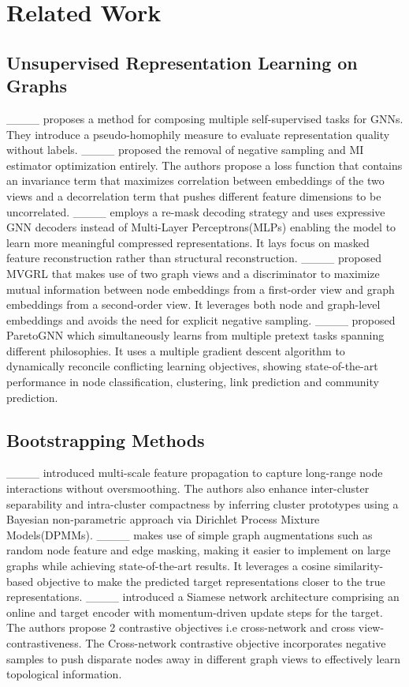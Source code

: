 \section{Related Work}
\subsection{Unsupervised Representation Learning on Graphs}
____ proposes a method for composing multiple self-supervised tasks for GNNs. They introduce a pseudo-homophily measure to evaluate representation quality without labels. ____ proposed the removal of negative sampling and MI estimator optimization entirely. The authors propose a loss function that contains an invariance term that maximizes correlation between embeddings of the two views and a decorrelation term that pushes different feature dimensions to be uncorrelated. ____ employs a re-mask decoding strategy and uses expressive GNN decoders instead of Multi-Layer Perceptrons(MLPs) enabling the model to learn more meaningful compressed representations. It lays focus on masked feature reconstruction rather than structural reconstruction. ____ proposed MVGRL that makes use of two graph views and a discriminator to maximize mutual information between node embeddings from a first-order view and graph embeddings from a second-order view. It leverages both node and graph-level embeddings and avoids the need for explicit negative sampling. ____ proposed ParetoGNN which simultaneously learns from multiple pretext tasks spanning different philosophies. It uses a multiple gradient descent algorithm to dynamically reconcile conflicting learning objectives, showing state-of-the-art performance in node classification, clustering, link prediction and community prediction. 

\subsection{Bootstrapping Methods}
 ____ introduced  multi-scale feature propagation to capture long-range node interactions without oversmoothing. The authors also enhance inter-cluster separability and intra-cluster compactness by inferring cluster prototypes using a Bayesian non-parametric approach via Dirichlet Process Mixture Models(DPMMs). ____ makes use of simple graph augmentations such as random node feature and edge masking, making it easier to implement on large graphs while achieving state-of-the-art results. It leverages a cosine similarity-based objective to make the predicted target representations closer to the true representations. ____ introduced a Siamese network architecture comprising an online and target encoder with momentum-driven update steps for the target. The authors propose 2 contrastive objectives i.e cross-network and cross view-contrastiveness. The Cross-network contrastive objective incorporates negative samples to push disparate nodes away in different graph views to effectively learn topological information.


